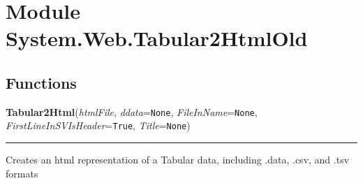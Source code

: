 %
%
%


\section{Module System.Web.Tabular2HtmlOld}

    \label{System:Web:Tabular2HtmlOld}


  \subsection{Functions}

    \label{System:Web:Tabular2HtmlOld:Tabular2Html}

    \vspace{0.5ex}

\hspace{.8\funcindent}\begin{boxedminipage}{\funcwidth}

    \raggedright \textbf{Tabular2Html}(\textit{htmlFile}, \textit{ddata}={\tt None}, \textit{FileInName}={\tt None}, \textit{FirstLineInSVIsHeader}={\tt True}, \textit{Title}={\tt None})

    \vspace{-1.5ex}

    \rule{\textwidth}{0.5\fboxrule}
\setlength{\parskip}{2ex}
    Creates an html representation of a Tabular data, including .data, 
    .csv, and .tsv formats

\setlength{\parskip}{1ex}
    \end{boxedminipage}

    \label{System:Web:Tabular2HtmlOld:Tabular2HtmlString}

